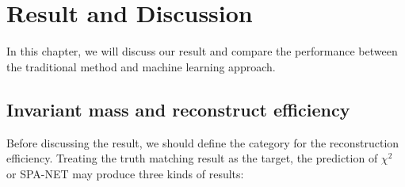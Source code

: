 \chapter{Result and Discussion} \label{Discussion}

In this chapter, we will discuss our result and compare the performance between the traditional method and machine learning approach.

\section{Invariant mass and reconstruct efficiency }\label{sec:inv mass and reco eff}

Before discussing the result, we should define the category for the reconstruction efficiency. Treating the truth matching result as the target, the prediction of $\chi^{2}$ or SPA-NET may produce three kinds of results:

